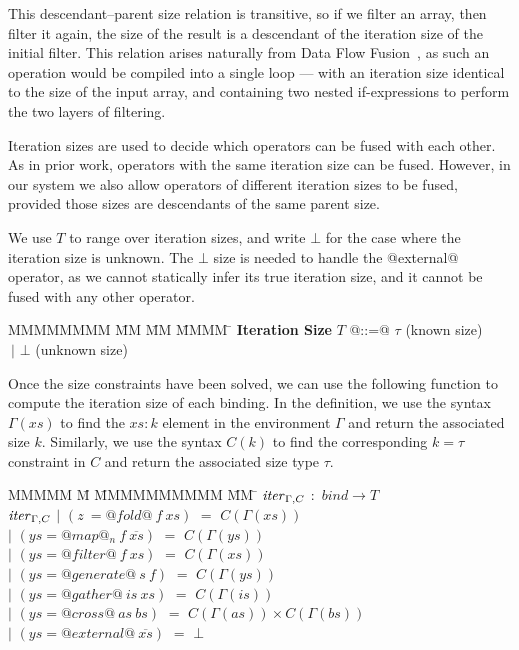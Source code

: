 This descendant--parent size relation is transitive, so if we filter an array, then filter it again, the size of the result is a descendant of the iteration size of the initial filter. This relation arises naturally from Data Flow Fusion~\cite{lippmeier2013data}, as such an operation would be compiled into a single loop --- with an iteration size identical to the size of the input array, and containing two nested if-expressions to perform the two layers of filtering.

Iteration sizes are used to decide which operators can be fused with each other. As in prior work, operators with the same iteration size can be fused. However, in our system we also allow operators of different iteration sizes to be fused, provided those sizes are descendants of the same parent size.

We use $T$ to range over iteration sizes, and write $\bot$ for the case where the iteration size is unknown. The $\bot$ size is needed to handle the @external@ operator, as we cannot statically infer its true iteration size, and it cannot be fused with any other operator.

\begin{tabbing}
MMMMMMMM \= MM       \= MM \= MMMM \= \kill
\textbf{Iteration Size}
 \> $T$         \> @::=@  \> $\tau$        \> (known size) \\
 \>             \> $~|$   \> $\bot$     \> (unknown size) \\
\end{tabbing}

Once the size constraints have been solved, we can use the following function to compute the iteration size of each binding. In the definition, we use the syntax $\Gamma(xs)$ to find the $xs : k$ element in the environment $\Gamma$ and return the associated size $k$. Similarly, we use the syntax $C(k)$ to find the corresponding $k = \tau$ constraint in $C$ and return the associated size type $\tau$.


\begin{tabbing}
MMMMM \= M \= MMMMMMMMMM \= MM \= \kill
$\mathit{iter}_{\Gamma,C}$  
        \>$:$\> $bind \rightarrow T$ 
\\[1ex]
$\mathit{iter}_{\Gamma,C}$
        \> $|$  \> $(z~ = @fold@~ f~xs)$     
                \> $=$ \> $C(\Gamma(xs))$ 
\\
        \> $|$  \> $(ys = @map@_n~f~\overline{xs})$
                \> $=$ \> $C(\Gamma(ys))$ 
\\
        \> $|$  \> $(ys = @filter@~f~xs)$    
                \> $=$ \> $C(\Gamma(xs))$ 
\\
        \> $|$  \> $(ys = @generate@~s~f)$  
                \> $=$ \> $C(\Gamma(ys))$ 
\\
        \> $|$  \> $(ys = @gather@~is~xs)$    
                \> $=$ \> $C(\Gamma(is))$ 
\\
        \> $|$  \> $(ys = @cross@~as~bs)$     
                \> $=$ \> $C(\Gamma(as)) \times C(\Gamma(bs))$ 
\\
        \> $|$  \> $(ys = @external@~\overline{xs})$  
                \> $=$ \> $\bot$ 
\\
\end{tabbing}



